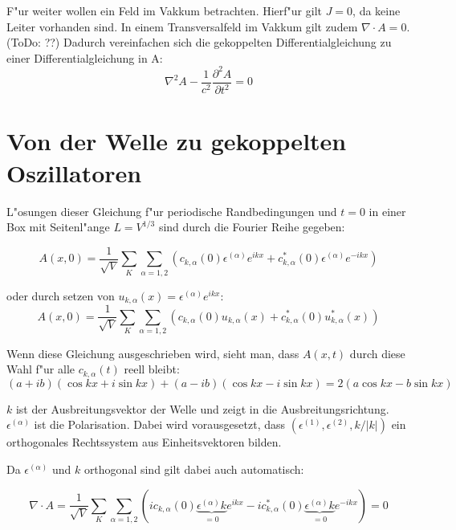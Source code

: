 F"ur weiter wollen ein Feld im Vakkum betrachten. Hierf"ur gilt $J = 0$, da keine Leiter vorhanden sind.
In einem Transversalfeld im Vakkum gilt zudem $\nabla \cdot A = 0$. (ToDo: ??) Dadurch vereinfachen sich die gekoppelten Differentialgleichung zu einer Differentialgleichung in A:
\begin{equation}
\nabla^2 A - \frac{1}{c^2} \frac{\partial^2 A }{\partial t^2} = 0
\end{equation}

\section{Von der Welle zu gekoppelten Oszillatoren}
L"osungen dieser Gleichung f"ur periodische Randbedingungen und $t=0$ in einer Box mit Seitenl"ange $L = V^{1/3}$ sind durch die Fourier Reihe gegeben:

\begin{equation}
A(x,0) = \frac{1}{\sqrt{V}} \sum_K \sum_{\alpha=1,2} (c_{k,\alpha}(0) \epsilon^{(\alpha)} e^{ikx} + c^*_{k,\alpha}(0) \epsilon^{(\alpha)} e^{-ikx})
\end{equation}

oder durch setzen von $u_{k,\alpha}(x) = \epsilon^{(\alpha)} e^{ikx}$:
\begin{equation}
A(x,0) = \frac{1}{\sqrt{V}} \sum_K \sum_{\alpha=1,2} (c_{k,\alpha}(0)u_{k,\alpha}(x) + c^*_{k,\alpha}(0) u^*_{k,\alpha}(x))
\end{equation}

Wenn diese Gleichung ausgeschrieben wird, sieht man, dass $A(x,t)$ durch diese Wahl f"ur alle $c_{k,\alpha}(t)$ reell bleibt:
\begin{equation}
(a + ib)(\cos kx + i \sin kx ) + (a - ib)(\cos kx - i \sin kx ) = 2 ( a \cos kx - b \sin kx )
\end{equation}

$k$ ist der Ausbreitungsvektor der Welle und zeigt in die Ausbreitungsrichtung. $\epsilon^{(\alpha)}$ ist die Polarisation. Dabei wird vorausgesetzt, dass $(\epsilon^{(1)}, \epsilon^{(2)} , k/|k|)$ ein orthogonales Rechtssystem aus Einheitsvektoren bilden.

Da $\epsilon^{(\alpha)}$ und $k$ orthogonal sind gilt dabei auch automatisch:

\begin{equation}
\nabla \cdot A = \frac{1}{\sqrt{V}} \sum_K \sum_{\alpha=1,2} (i c_{k,\alpha}(0) \underbrace{\epsilon^{(\alpha)} k}_{=0} e^{ikx} - i c^*_{k,\alpha}(0) \underbrace{\epsilon^{(\alpha)} k}_{=0} e^{-ikx}) = 0
\end{equation}

